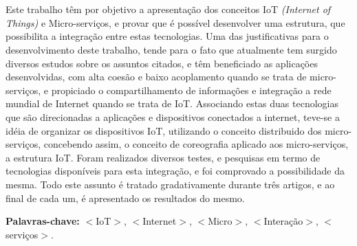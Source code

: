 \section*{}

Este trabalho têm por objetivo a apresentação dos conceitos IoT \emph{(Internet of Things)} e Micro-serviços, e provar que é possível desenvolver uma estrutura, que possibilita a integração entre estas tecnologias. Uma das justificativas para o desenvolvimento deste trabalho, tende para o fato que atualmente tem surgido diversos estudos sobre os assuntos citados, e têm beneficiado as aplicações desenvolvidas, com alta coesão e baixo acoplamento quando se trata de micro-serviços, e propiciado o compartilhamento de informações e integração a rede mundial de Internet quando se trata de IoT. Associando estas duas tecnologias que são direcionadas a aplicações e dispositivos conectados a internet, teve-se a idéia de organizar os dispositivos IoT, utilizando o conceito distribuido dos micro-serviços, concebendo assim, o conceito de coreografia aplicado aos micro-serviços, a estrutura IoT. Foram realizados diversos testes, e pesquisas em termo de tecnologias disponíveis para esta integração, e foi comprovado a possibilidade da mesma. Todo este assunto é tratado gradativamente durante três artigos, e ao final de cada um, é apresentado os resultados do mesmo.

{\bf Palavras-chave:} $<$IoT$>$,  $<$Internet$>$, $<$Micro$>$, $<$Interação$>$, $<$serviços$>$.